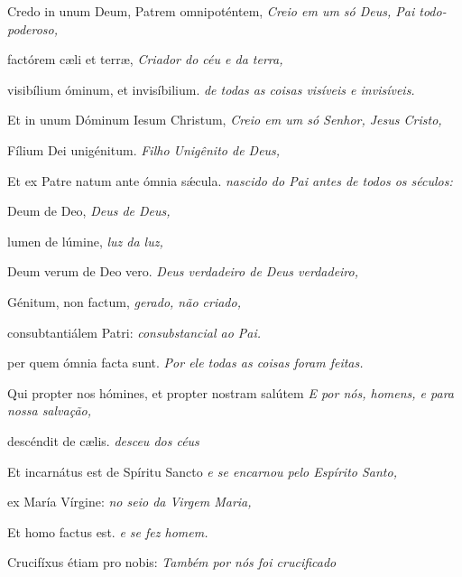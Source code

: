 \begin{paracol}{2}
  Credo in unum Deum, Patrem omnipoténtem,
  \switchcolumn
  \emph{Creio em um só Deus, Pai todo-poderoso,}
  \switchcolumn*

  factórem c{\ae}li et terr{\ae},
  \switchcolumn
  \emph{Criador do céu e da terra,}
  \switchcolumn*

  visibílium óminum, et invisíbilium.
  \switchcolumn
  \emph{de todas as coisas visíveis e invisíveis.}
  \switchcolumn*

  Et in unum Dóminum Iesum Christum,
  \switchcolumn
  \emph{Creio em um só Senhor, Jesus Cristo,}
  \switchcolumn*

  Fílium Dei unigénitum.
  \switchcolumn
  \emph{Filho Unigênito de Deus,}
  \switchcolumn*

  Et ex Patre natum ante ómnia s\'{\ae}cula.
  \switchcolumn
  \emph{nascido do Pai antes de todos os séculos:}
  \switchcolumn*

  Deum de Deo,
  \switchcolumn
  \emph{Deus de Deus,}
  \switchcolumn*

  lumen de lúmine,
  \switchcolumn
  \emph{luz da luz,}
  \switchcolumn*

  Deum verum de Deo vero.
  \switchcolumn
  \emph{Deus verdadeiro de Deus verdadeiro,}
  \switchcolumn*

  Génitum, non factum,
  \switchcolumn
  \emph{gerado, não criado,}
  \switchcolumn*

  consubtantiálem Patri:
  \switchcolumn
  \emph{consubstancial ao Pai.}
  \switchcolumn*

  per quem ómnia facta sunt.
  \switchcolumn
  \emph{Por ele todas as coisas foram feitas.}
  \switchcolumn*

  Qui propter nos hómines, et propter nostram salútem
  \switchcolumn
  \emph{E por nós, homens, e para nossa salvação,}
  \switchcolumn*

  descéndit de c{\ae}lis.
  \switchcolumn
  \emph{desceu dos céus}
  \switchcolumn*

  Et incarnátus est de Spíritu Sancto
  \switchcolumn
  \emph{e se encarnou pelo Espírito Santo,}
  \switchcolumn*

  ex María Vírgine:
  \switchcolumn
  \emph{no seio da Virgem Maria,}
  \switchcolumn*

  Et homo factus est.
  \switchcolumn
  \emph{e se fez homem.}
  \switchcolumn*

  Crucifíxus étiam pro nobis:
  \switchcolumn
  \emph{Também por nós foi crucificado}
  \switchcolumn*


\end{paracol}
